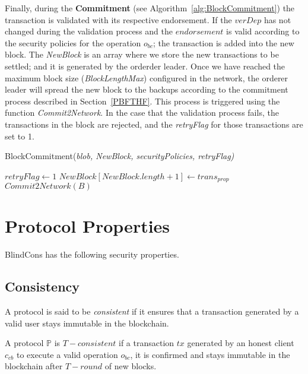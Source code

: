 \documentclass[conference]{llncs}
\newcommand{\name}{BlindCons}
\begin{document}
Finally, during the \textbf{Commitment} (see Algorithm~\ref{alg:BlockCommitment}) the transaction is validated with its respective endorsement. If the $verDep$ has not changed during the validation process and the $endorsement$ is valid according to the security policies for the operation $o_{bc}$; the transaction is added into the new block. The \textit{NewBlock} is an array where we store the new transactions to be settled; and it is generated by the orderder leader. Once we have reached the maximum block size (\textit{BlockLengthMax}) configured in the network, the orderer leader will spread the new block to the backups according to the commitment process described in Section~\ref{PBFTHF}. This process is triggered using the function \textit{Commit2Network}. In the case that the validation process fails, the transactions in the block are rejected, and the \textit{retryFlag} for those transactions are set to 1. 

\begin{algorithm}[ht]
\caption{BlockCommitment(\emph{blob, NewBlock, securityPolicies, retryFlag)}}
\label{alg:BlockCommitment}
\begin{algorithmic}[1]
\RETURN $retryFlag \gets 1$
\ELSE \STATE $NewBlock [NewBlock.length + 1] \gets trans_{prop}$ \ENDIF
{}
\RETURN $Commit2Network(B)$ \ENDIF
\end{algorithmic}
\end{algorithm}

\section{Protocol Properties}
\label{PROP}

\name{} has the following security properties.

\subsection{Consistency}
A protocol is said to be \emph{consistent} if it ensures that a transaction generated by a valid user stays immutable in the blockchain.

\begin{definition}
A protocol $\mathbb{P}$ is $T-consistent$ if a transaction $tx$ generated by an honest client $c_{cb}$ to execute a valid operation $o_{bc}$, it is confirmed and stays immutable in the blockchain after $T-round$ of new blocks.
\end{definition}
\end{document}
